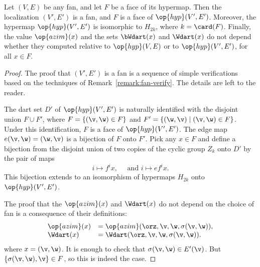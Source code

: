 \begin{lemma}[localization]
\label{lemma:localization}
Let $(V,E)$ be any fan, and let $F$ be a face of its hypermap.  Then
the localization $(V',E')$ is a fan, and $F$ is a face of
$\op{hyp}(V',E')$.  Moreover, the hypermap $\op{hyp}(V',E')$ is
isomorphic to $H_{2k}$, where $k= \card(F)$.  Finally, the value
$\op{azim}(x)$ and the sets $\bWdart(x)$ and $\Wdart(x)$ do not depend
whether they computed relative to $\op{hyp}(V,E)$ or to
$\op{hyp}(V',E')$, for all $x\in F$.
\end{lemma}



\begin{proof}
The proof that $(V',E')$ is a fan is a sequence of simple
verifications based on the techniques of
Remark~\ref{remark:fan-verify}.  The details are left to the reader.

The dart set $D'$ of $\op{hyp}(V',E')$ is naturally identified with
the disjoint union $F\cup F'$, where $F = \{(\v,\w) \in F\}$ and
$F'=\{(\w,\v) \mid (\v,\w)\in F\}$.  Under this identification, $F$
is a face of $\op{hyp}(V',E')$.  The edge map $e(\v,\w)= (\w,\v)$ is
a bijection of $F$ onto $F'$.  Pick any $x\in F$ and define a
bijection from the disjoint union of two copies of the cyclic group
$Z_k$ onto $D'$ by the pair of maps
\begin{displaymath}
i \mapsto f^i x,\quad\text{ and } i\mapsto e f^i x.
\end{displaymath}
This bijection extends to an isomorphism of hypermaps $H_{2k}$ onto
$\op{hyp}(V',E')$.

The proof that the $\op{azim}(x)$ and $\Wdart(x)$ do not depend on the
choice of fan is a consequence of their definitions:
\begin{displaymath}
\begin{array}{lll}
\op{azim}(x) &= \op{azim}(\orz,\v,\w,\sigma(\v,\w)),\\
\Wdart(x) &= \Wdart(\orz,\v,\w,\sigma(\v,\w)).\\
\end{array}
\end{displaymath}
where $x = (\v,\w)$.  It is enough to check that $\sigma(\v,\w)\in
E'(\v)$.  But $\{\sigma(\v,\w),\v\}\in F$, so this is indeed the case.
\end{proof}



